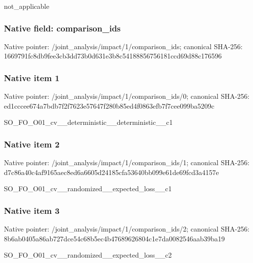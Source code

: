 \documentclass[10pt,a4paper]{article}
\begin{document}
\begingroup\raggedright\sloppy not\_\allowbreak{}applicable\par\endgroup

\subsubsection{Native field: comparison\_\allowbreak{}ids}
Native pointer: /joint\_\allowbreak{}analysis/impact/1/comparison\_\allowbreak{}ids; canonical SHA-256: 1669791fc8db9fee3cb3dd73b0d631e3b8c54188856756181ccd69d88c176596

\subsubsection{Native item 1}
Native pointer: /joint\_\allowbreak{}analysis/impact/1/comparison\_\allowbreak{}ids/0; canonical SHA-256: ed1cccee674a7bdb7f2f7623e57647f280b85ed4f0863efb7f7cee099ba5209c

\begingroup\raggedright\sloppy SO\_\allowbreak{}FO\_\allowbreak{}O01\_\allowbreak{}cv\_\allowbreak{}\_\allowbreak{}deterministic\_\allowbreak{}\_\allowbreak{}deterministic\_\allowbreak{}\_\allowbreak{}c1\par\endgroup

\subsubsection{Native item 2}
Native pointer: /joint\_\allowbreak{}analysis/impact/1/comparison\_\allowbreak{}ids/1; canonical SHA-256: d7c86a40c4af9165aec8ed6a6605d24185cfa53640bb099e61de69fcd3a4157e

\begingroup\raggedright\sloppy SO\_\allowbreak{}FO\_\allowbreak{}O01\_\allowbreak{}cv\_\allowbreak{}\_\allowbreak{}randomized\_\allowbreak{}\_\allowbreak{}expected\_\allowbreak{}loss\_\allowbreak{}\_\allowbreak{}c1\par\endgroup

\subsubsection{Native item 3}
Native pointer: /joint\_\allowbreak{}analysis/impact/1/comparison\_\allowbreak{}ids/2; canonical SHA-256: 8b6ab0405a86ab727dce54c68b5ec4b47689626804c1e7da0082546aab39ba19

\begingroup\raggedright\sloppy SO\_\allowbreak{}FO\_\allowbreak{}O01\_\allowbreak{}cv\_\allowbreak{}\_\allowbreak{}randomized\_\allowbreak{}\_\allowbreak{}expected\_\allowbreak{}loss\_\allowbreak{}\_\allowbreak{}c2\par\endgroup
\end{document}
